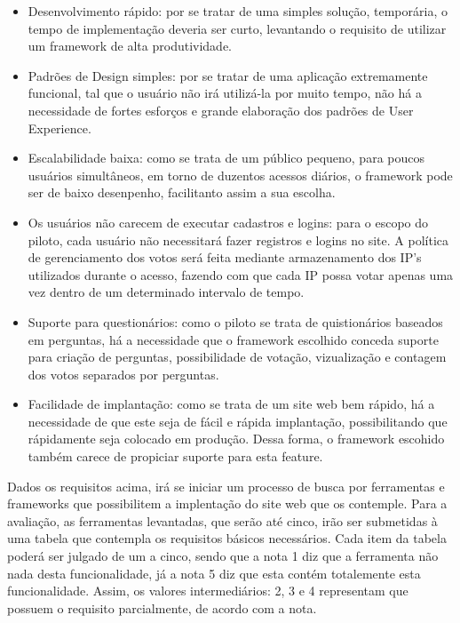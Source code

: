 \begin{itemize}
    \item Desenvolvimento rápido: por se tratar de uma simples solução, temporária, o tempo de implementação deveria
        ser curto, levantando o requisito de utilizar um framework de alta produtividade.
    \item Padrões de Design simples: por se tratar de uma aplicação extremamente funcional, tal que o usuário não irá
        utilizá-la por muito tempo, não há a necessidade de fortes esforços e grande elaboração dos padrões de
        User Experience.
    \item Escalabilidade baixa: como se trata de um público pequeno, para poucos usuários simultâneos, em torno de duzentos
        acessos diários, o framework pode ser de baixo desenpenho, facilitanto assim a sua escolha.
    \item Os usuários não carecem de executar cadastros e logins: para o escopo do piloto, cada usuário não necessitará
        fazer registros e logins no site. A política de gerenciamento dos votos será feita mediante armazenamento dos
        IP's utilizados durante o acesso, fazendo com que cada IP possa votar apenas uma vez dentro de um determinado
        intervalo de tempo.
    \item Suporte para questionários: como o piloto se trata de quistionários baseados em perguntas, há a necessidade que o framework
        escolhido conceda suporte para criação de perguntas, possibilidade de votação, vizualização e contagem dos votos
        separados por perguntas.
    \item Facilidade de implantação: como se trata de um site web bem rápido, há a necessidade de que este seja de fácil e rápida
        implantação, possibilitando que rápidamente seja colocado em produção. Dessa forma, o framework escohido também carece
        de propiciar suporte para esta feature.
\end{itemize}

Dados os requisitos acima, irá se iniciar um processo de busca por ferramentas e frameworks que possibilitem a implentação do site
web que os contemple. Para a avaliação, as ferramentas levantadas, que serão até cinco, irão ser submetidas à uma tabela que contempla
os requisitos básicos necessários. Cada item da tabela poderá ser julgado de um a cinco, sendo que a nota 1 diz que a ferramenta não nada
desta funcionalidade, já a nota 5 diz que esta contém totalemente esta funcionalidade. Assim, os valores intermediários: 2, 3 e 4 representam
que possuem o requisito parcialmente, de acordo com a nota.

